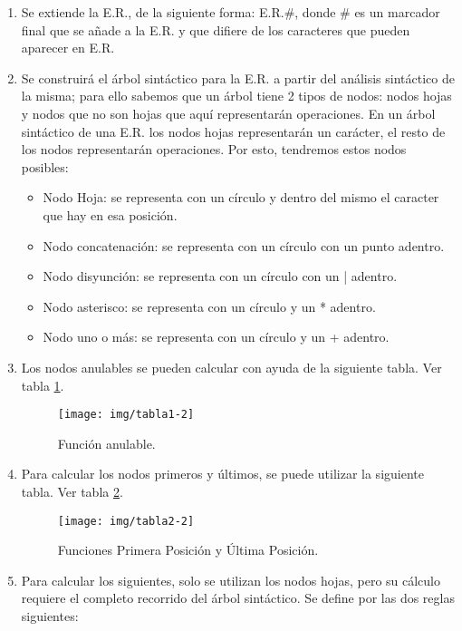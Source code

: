 \documentclass{report}
\begin{document}
\begin{enumerate}
	\item Se extiende la E.R., de la siguiente forma: E.R.\#, donde \# es un marcador final que se añade a la E.R. y que difiere de los caracteres que pueden aparecer en E.R.
	\item Se construirá el árbol sintáctico para la E.R. a partir del análisis sintáctico de la misma; para ello sabemos que un árbol tiene 2 tipos de nodos: nodos hojas y nodos que no son hojas que aquí representarán operaciones. En un árbol sintáctico de una E.R. los nodos hojas representarán un carácter, el resto de los nodos representarán operaciones. Por esto, tendremos estos nodos posibles:
	\begin{itemize}
		\item Nodo Hoja: se representa con un círculo y dentro del mismo el caracter que hay en esa posición.
		\item Nodo concatenación: se representa con un círculo con un punto adentro.
		\item Nodo disyunción: se representa con un círculo con un | adentro.
		\item Nodo asterisco: se representa con un círculo y un * adentro.
		\item Nodo uno o más: se representa con un círculo y un + adentro.
	\end {itemize}
	\item Los nodos anulables se pueden calcular con ayuda de la siguiente tabla. Ver tabla \ref{fig:anulable}.

	\begin{figure}
		\centering
		\texttt{[image: img/tabla1-2]}
		\caption{Función anulable.}
		\label{fig:anulable}
	\end{figure}

	\item Para calcular los nodos primeros y últimos, se puede utilizar la siguiente tabla. Ver tabla \ref{fig:primeros y ultimos}.

	\begin{figure}
		\centering
		\texttt{[image: img/tabla2-2]}
		\caption{Funciones Primera Posición y Última Posición.}
		\label{fig:primeros y ultimos}
	\end{figure}

	\item Para calcular los siguientes, solo se utilizan los nodos hojas, pero su cálculo requiere el completo recorrido del árbol sintáctico. Se define por las dos reglas siguientes:


\end{enumerate}
\end{document}
